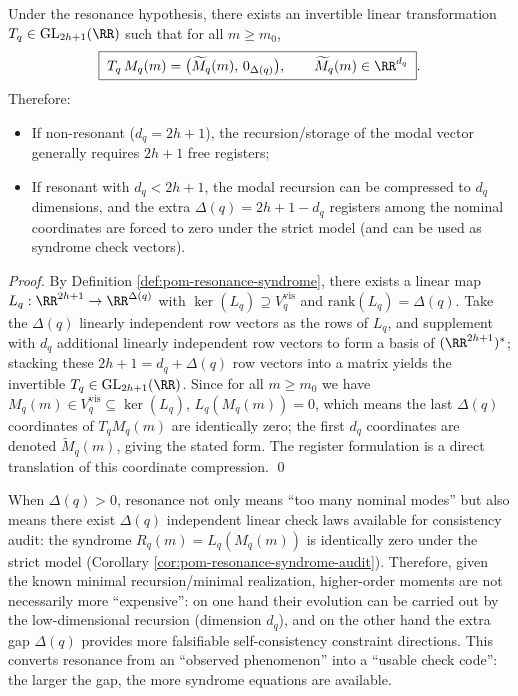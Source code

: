 \begin{corollary}\label{cor:pom-resonance-register-savings}
Under the resonance hypothesis, there exists an invertible linear transformation \(T_q\in\mathrm{GL}_{2h+1}(\RR)\) such that for all \(m\ge m_0\),
\[
\boxed{\;
T_q\,M_q(m)=\bigl(\widetilde M_q(m),\,0_{\Delta(q)}\bigr),\qquad
\widetilde M_q(m)\in\RR^{d_q}\; }.
\]
Therefore:
\begin{itemize}
  \item If non-resonant (\(d_q=2h+1\)), the recursion/storage of the modal vector generally requires \(2h+1\) free registers;
  \item If resonant with \(d_q<2h+1\), the modal recursion can be compressed to \(d_q\) dimensions, and the extra \(\Delta(q)=2h+1-d_q\) registers among the nominal coordinates are forced to zero under the strict model (and can be used as syndrome check vectors).
\end{itemize}
\end{corollary}
\begin{proof}
By Definition \ref{def:pom-resonance-syndrome}, there exists a linear map \(L_q:\RR^{2h+1}\to\RR^{\Delta(q)}\) with \(\ker(L_q)\supseteq V_q^{\mathrm{vis}}\) and \(\mathrm{rank}(L_q)=\Delta(q)\).
Take the \(\Delta(q)\) linearly independent row vectors as the rows of \(L_q\), and supplement with \(d_q\) additional linearly independent row vectors to form a basis of \((\RR^{2h+1})^\ast\); stacking these \(2h+1=d_q+\Delta(q)\) row vectors into a matrix yields the invertible \(T_q\in\mathrm{GL}_{2h+1}(\RR)\).
Since for all \(m\ge m_0\) we have \(M_q(m)\in V_q^{\mathrm{vis}}\subseteq\ker(L_q)\),
\(
L_q(M_q(m))=0
\), which means the last \(\Delta(q)\) coordinates of \(T_q M_q(m)\) are identically zero; the first \(d_q\) coordinates are denoted \(\widetilde M_q(m)\), giving the stated form.
The register formulation is a direct translation of this coordinate compression. \qed
\end{proof}

\begin{remark}\label{rem:pom-resonance-as-resource}
When \(\Delta(q)>0\), resonance not only means ``too many nominal modes'' but also means there exist \(\Delta(q)\) independent linear check laws available for consistency audit: the syndrome \(R_q(m)=L_q(M_q(m))\) is identically zero under the strict model (Corollary \ref{cor:pom-resonance-syndrome-audit}).
Therefore, given the known minimal recursion/minimal realization, higher-order moments are not necessarily more ``expensive'': on one hand their evolution can be carried out by the low-dimensional recursion (dimension \(d_q\)), and on the other hand the extra gap \(\Delta(q)\) provides more falsifiable self-consistency constraint directions.
This converts resonance from an ``observed phenomenon'' into a ``usable check code'': the larger the gap, the more syndrome equations are available.
\end{remark}

